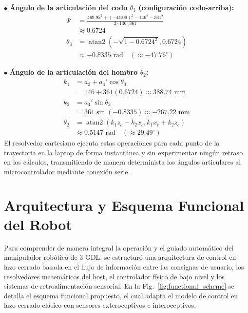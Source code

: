 \documentclass[conference,a4paper]{IEEEtran}
\begin{document}
\noindent $\bullet$ \textbf{Ángulo de la articulación del codo $\theta_3$ (configuración codo-arriba):}
\begin{align*}
\Psi &= \frac{469.95^2 + (-41.09)^2 - 146^2 - 361^2}{2 \cdot 146 \cdot 361} \\
&\approx 0.6724 \\
\theta_3 &= \operatorname{atan2}\left( -\sqrt{1 - 0.6724^2}, 0.6724 \right) \\
&\approx -0.8335\text{ rad} \quad (\approx -47.76^\circ)
\end{align*}

\noindent $\bullet$ \textbf{Ángulo de la articulación del hombro $\theta_2$:}
\begin{align*}
k_1 &= a_3 + a_4' \cos\theta_3 \\
&= 146 + 361(0.6724) \approx 388.74\text{ mm} \\
k_2 &= a_4' \sin\theta_3 \\
&= 361\sin(-0.8335) \approx -267.22\text{ mm} \\
\theta_2 &= \operatorname{atan2}(k_1 z_c - k_2 x_c, k_1 x_c + k_2 z_c) \\
&\approx 0.5147\text{ rad} \quad (\approx 29.49^\circ)
\end{align*}
El resolvedor cartesiano ejecuta estas operaciones para cada punto de la trayectoria en la laptop de forma instantánea y sin experimentar ningún retraso en los cálculos, transmitiendo de manera determinista los ángulos articulares al microcontrolador mediante conexión serie.

\newpage
\section{Arquitectura y Esquema Funcional del Robot}
Para comprender de manera integral la operación y el guiado automático del manipulador robótico de 3 GDL, se estructuró una arquitectura de control en lazo cerrado basada en el flujo de información entre las consignas de usuario, los resolvedores matemáticos del host, el controlador físico de bajo nivel y los sistemas de retroalimentación sensorial. En la Fig.~\ref{fig:functional_scheme} se detalla el esquema funcional propuesto, el cual adapta el modelo de control en lazo cerrado clásico con sensores exteroceptivos e interoceptivos.
\end{document}
